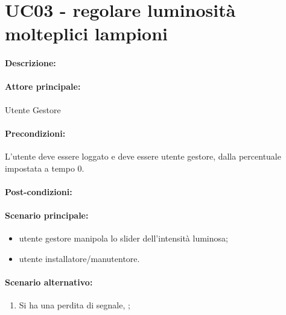 \section{UC03 - regolare luminosità molteplici lampioni}

\paragraph{Descrizione:}


\paragraph{Attore principale:}

Utente Gestore%

\paragraph{Precondizioni:}
L'utente deve essere loggato e deve essere utente gestore, dalla percentuale impostata a tempo 0.

\paragraph{Post-condizioni:}

\paragraph{Scenario principale:}
\begin{itemize}
    \item utente gestore manipola lo slider dell'intensità luminosa;
    \item utente installatore/manutentore.
\end{itemize}

\paragraph{Scenario alternativo:}
\begin{enumerate}
    \item Si ha una perdita di segnale, ;
\end{enumerate}